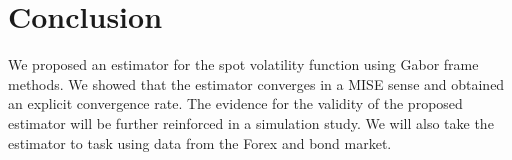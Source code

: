 \section{Conclusion} \label{sec:conclusion}
We proposed an estimator for the spot volatility function using Gabor frame methods. We showed that the estimator converges in a MISE sense and obtained an explicit convergence rate.  The evidence for the validity of the proposed estimator will be further reinforced in a simulation study. We will also take the estimator to task using data from the Forex and bond market. 






